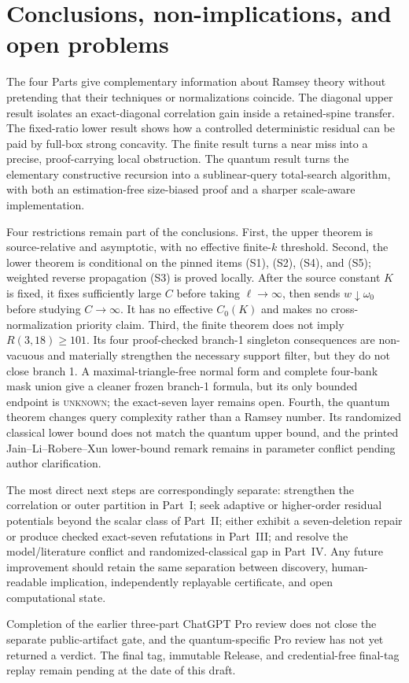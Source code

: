 \section{Conclusions, non-implications, and open problems}
\label{sec:unified-conclusion}

The four Parts give complementary information about Ramsey theory without
pretending that their techniques or normalizations coincide.  The diagonal
upper result isolates an exact-diagonal correlation gain inside a
retained-spine transfer.  The fixed-ratio lower result shows how a controlled
deterministic residual can be paid by full-box strong concavity.  The finite
result turns a near miss into a precise, proof-carrying local obstruction.
The quantum result turns the elementary constructive recursion into a
sublinear-query total-search algorithm, with both an estimation-free
size-biased proof and a sharper scale-aware implementation.

Four restrictions remain part of the conclusions.  First, the upper theorem
is source-relative and asymptotic, with no effective finite-$k$ threshold.
Second, the lower theorem is conditional on the pinned items (S1), (S2),
(S4), and (S5); weighted reverse propagation (S3) is proved locally.  After
the source constant $K$ is fixed, it fixes sufficiently large $C$ before taking
$\ell\to\infty$, then sends $w\downarrow\omega_0$ before studying
$C\to\infty$.  It has no effective $C_0(K)$ and makes no
cross-normalization priority claim.  Third, the finite theorem does not imply
$R(3,18)\ge101$.  Its four proof-checked branch-1 singleton consequences are
non-vacuous and materially strengthen the necessary support filter, but they
do not close branch 1.  A maximal-triangle-free normal form and complete
four-bank mask union give a cleaner frozen branch-1 formula, but its only
bounded endpoint is \textsc{unknown}; the exact-seven layer remains open.
Fourth, the quantum theorem changes query complexity rather than a Ramsey
number.  Its randomized classical lower bound does not match the quantum
upper bound, and the printed Jain--Li--Robere--Xun lower-bound remark remains
in parameter conflict pending author clarification.

The most direct next steps are correspondingly separate: strengthen the
correlation or outer partition in Part~I; seek adaptive or higher-order
residual potentials beyond the scalar class of Part~II; either exhibit a
seven-deletion repair or produce checked exact-seven refutations in
Part~III; and resolve the model/literature conflict and randomized-classical
gap in Part~IV\@.
Any future improvement should retain the same separation between discovery,
human-readable implication, independently replayable certificate, and open
computational state.

Completion of the earlier three-part ChatGPT Pro review does not close the
separate public-artifact gate, and the quantum-specific Pro review has not yet
returned a verdict.  The final tag, immutable Release, and credential-free
final-tag replay remain pending at the date of this draft.
